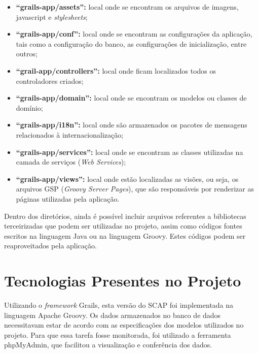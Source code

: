 \begin{itemize}

	\item \textbf{``grails-app/assets'':} local onde se encontram os arquivos de imagens, javascript e \textit{stylesheets};

	\item \textbf{``grails-app/conf'':} local onde se encontram as configurações da aplicação, tais como a configuração do banco, as configurações de inicialização, entre outros;

	\item \textbf{``grail-app/controllers'':} local onde ficam localizados todos os controladores criados;
	
	\item \textbf{``grails-app/domain'':} local onde se encontram os modelos ou classes de domínio;
	
	\item \textbf{``grails-app/i18n'':} local onde são armazenados os pacotes de mensagens relacionados à internacionalização;
	
	\item \textbf{``grails-app/services'':} local onde se encontram as classes utilizadas na camada de serviços (\textit{Web Services});
	
	\item \textbf{``grails-app/views'':} local onde estão localizadas as visões, ou seja, os arquivos GSP (\textit{Groovy Server Pages}), que são responsáveis por renderizar as páginas utilizadas pela aplicação. 
	
\end{itemize}

Dentro dos diretórios, ainda é possível incluir arquivos referentes a bibliotecas terceirizadas que podem ser utilizadas no projeto, assim como códigos fontes escritos na linguagem Java ou na linguagem Groovy. Estes códigos podem ser reaproveitados pela aplicação.

\section{Tecnologias Presentes no Projeto}
\label{sec-projeto-tecnologias-presentes}

Utilizando o \textit{framework} Grails, esta versão do SCAP foi implementada na linguagem Apache Groovy. Os dados armazenados no banco de dados necessitavam estar de acordo com as especificações dos modelos utilizados no projeto. Para que essa tarefa fosse monitorada, foi utilizado a ferramenta phpMyAdmin, que facilitou a visualização e conferência dos dados.

